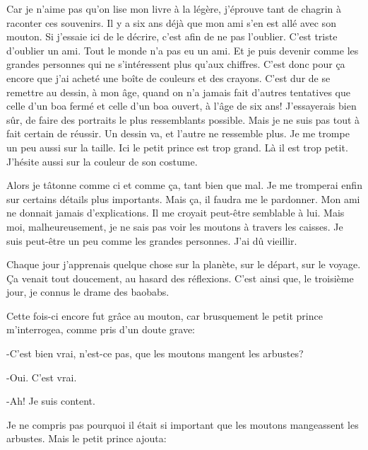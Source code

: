 \documentclass{report}
\begin{document}
Car je n'aime pas qu'on lise mon livre à la légère, j'éprouve tant de chagrin à raconter ces souvenirs. Il y a six ans déjà que mon ami s'en est allé avec son mouton. Si j'essaie ici de le décrire, c'est afin de ne pas l'oublier. C'est triste d'oublier un ami. Tout le monde n'a pas eu un ami. Et je puis devenir comme les grandes personnes qui ne s'intéressent plus qu'aux chiffres. C'est donc pour ça encore que j'ai acheté une boîte de couleurs et des crayons. C'est dur de se remettre au dessin, à mon âge, quand on n'a jamais fait d'autres tentatives que celle d'un boa fermé et celle d'un boa ouvert, à l'âge de six ans! J'essayerais bien sûr, de faire des portraits le plus ressemblants possible. Mais je ne suis pas tout à fait certain de réussir. Un dessin va, et l'autre ne ressemble plus. Je me trompe un peu aussi sur la taille. Ici le petit prince est trop grand. Là il est trop petit. J'hésite aussi sur la couleur de son costume.

Alors je tâtonne comme ci et comme ça, tant bien que mal. Je me tromperai enfin sur certains détails plus importants. Mais ça, il faudra me le pardonner. Mon ami ne donnait jamais d'explications. Il me croyait peut-être semblable à lui. Mais moi, malheureusement, je ne sais pas voir les moutons à travers les caisses. Je suis peut-être un peu comme les grandes personnes. J'ai dû vieillir.

\parachapter[V]{} %
Chaque jour j'apprenais quelque chose sur la planète, sur le départ, sur le voyage. Ça venait tout doucement, au hasard des réflexions. C'est ainsi que, le troisième jour, je connus le drame des baobabs.

Cette fois-ci encore fut grâce au mouton, car brusquement le petit prince m'interrogea, comme pris d'un doute grave:

-C'est bien vrai, n'est-ce pas, que les moutons mangent les arbustes?

-Oui. C'est vrai.

-Ah! Je suis content.

Je ne compris pas pourquoi il était si important que les moutons mangeassent les arbustes. Mais le petit prince ajouta:
\end{document}
